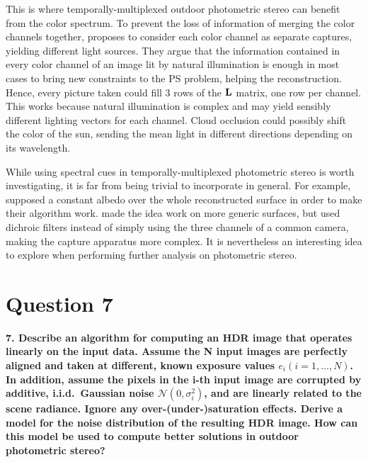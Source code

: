 \documentclass{report}
\begin{document}
This is where temporally-multiplexed outdoor photometric stereo can benefit from the color spectrum. To prevent the loss of information of merging the color channels together, \cite{johnson-cvpr-11} proposes to consider each color channel as separate captures, yielding different light sources. They argue that the information contained in every color channel of an image lit by natural illumination is enough in most cases to bring new constraints to the PS problem, helping the reconstruction. Hence, every picture taken could fill 3 rows of the $\mathbf{L}$ matrix, one row per channel. This works because natural illumination is complex and may yield sensibly different lighting vectors for each channel. Cloud occlusion could possibly shift the color of the sun, sending the mean light in different directions depending on its wavelength.

While using spectral cues in temporally-multiplexed photometric stereo is worth investigating, it is far from being trivial to incorporate in general. For example, \cite{johnson-cvpr-11} supposed a constant albedo over the whole reconstructed surface in order to make their algorithm work. \cite{Fyffe2011} made the idea work on more generic surfaces, but used dichroic filters instead of simply using the three channels of a common camera, making the capture apparatus more complex. It is nevertheless an interesting idea to explore when performing further analysis on photometric stereo.

\section{Question 7}
\textbf{7. Describe an algorithm for computing an HDR image that operates linearly on the input data.
Assume the N input images are perfectly aligned and taken at different, known exposure values $e_i (i = 1, \dots , N )$. In addition, assume the pixels in the i-th input image are corrupted by additive, i.i.d.\ Gaussian noise $\mathcal{N} (0, \sigma_i^2)$, and are linearly related to the scene radiance. Ignore any over-(under-)saturation effects. Derive a model for the noise distribution of the resulting HDR image. How can this model be used to compute better solutions in outdoor photometric stereo?}
\end{document}
